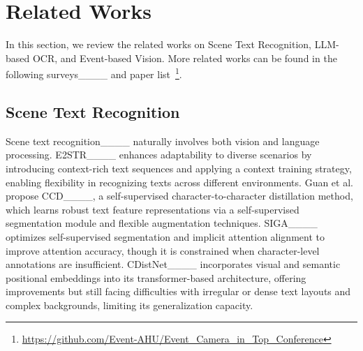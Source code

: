 \section{Related Works}
\label{sec::relatedWorks}

In this section, we review the related works on Scene Text Recognition, LLM-based OCR, and Event-based Vision. More related works can be found in the following surveys____ and paper list~\footnote{\url{https://github.com/Event-AHU/Event_Camera_in_Top_Conference}}. 


\subsection{Scene Text Recognition} 
Scene text recognition____ naturally involves both vision and language processing. 
E2STR____ enhances adaptability to diverse scenarios by introducing context-rich text sequences and applying a context training strategy, enabling flexibility in recognizing texts across different environments. 
Guan et al. propose CCD____, a self-supervised character-to-character distillation method, which learns robust text feature representations via a self-supervised segmentation module and flexible augmentation techniques. 
SIGA____ optimizes self-supervised segmentation and implicit attention alignment to improve attention accuracy, though it is constrained when character-level annotations are insufficient. 
CDistNet____ incorporates visual and semantic positional embeddings into its transformer-based architecture, offering improvements but still facing difficulties with irregular or dense text layouts and complex backgrounds, limiting its generalization capacity. 
